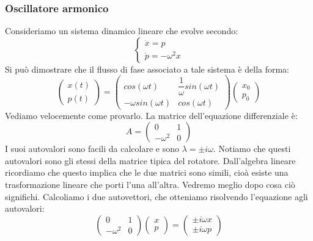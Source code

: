 \documentclass[a4paper,openany]{article}
\begin{document}
	\subsubsection{Oscillatore armonico}
	Consideriamo un sistema dinamico lineare che evolve secondo:
	\begin{equation}
		\begin{cases}
			\dot{x} = p \\
			\dot{p} = -\omega^{2}x
		\end{cases}
	\end{equation}
	Si può dimostrare che il flusso di fase associato a tale sistema è della forma:
	\begin{equation}
		\begin{pmatrix}
			x(t) \\
			p(t)
		\end{pmatrix} =
		\begin{pmatrix}
			cos(\omega t) & \dfrac{1}{\omega} sin(\omega t) \\
			-\omega sin(\omega t) & cos(\omega t)
		\end{pmatrix}
		\begin{pmatrix}
			x_{0} \\
			p_{0}
		\end{pmatrix}
	\end{equation}
	Vediamo velocemente come provarlo. La matrice dell'equazione differenziale è:
	\begin{equation}
		A =
		\begin{pmatrix}
			0 & 1 \\
			- \omega^2 & 0
		\end{pmatrix}
	\end{equation}
	I suoi autovalori sono facili da calcolare e sono $\lambda = \pm i \omega $. Notiamo che questi autovalori sono gli stessi della matrice tipica del rotatore. Dall'algebra lineare ricordiamo che questo implica che le due matrici sono simili, cioà esiste una trasformazione lineare che porti l'una all'altra. Vedremo meglio dopo cosa ciò significhi. Calcoliamo i due autovettori, che otteniamo risolvendo l'equazione agli autovalori:
	\begin{equation}\label{key}
		\begin{pmatrix}
			0 & 1 \\
			- \omega^2 & 0
		\end{pmatrix}
		\begin{pmatrix}
			x \\ p
		\end{pmatrix}
		= \begin{pmatrix}
			\pm i\omega x \\ \pm i\omega p
		\end{pmatrix}
	\end{equation}
\end{document}
